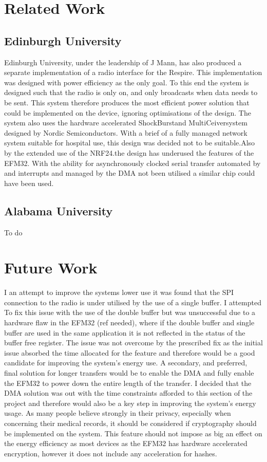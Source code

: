 \section{Related Work}

\subsection{Edinburgh University}
Edinburgh University, under the leadership of J Mann, has also produced a separate implementation
of a radio interface for the Respire. This implementation was designed with power efficiency as the
only goal. To this end the system is designed such that the radio is only on, and only broadcasts
when data needs to be sent. This system therefore produces the most efficient power solution that
could be implemented on the device, ignoring optimisations of the design. The system also uses the
hardware accelerated ShockBurst\textregistered and MultiCeiver\textregistered system designed by Nordic Semiconductors.
With a brief of a fully managed network system suitable for hospital use, this design was decided not
to be suitable.Also by the extended use of the NRF24.the design has underused the features of the
EFM32. With the ability for asynchronously clocked serial transfer automated by and interrupts and
managed by the DMA not been utilised a similar chip could have been used.

\subsection{Alabama University}
To do

\section{Future Work}
I an attempt to improve the systems lower use it was found that the SPI connection to the radio is
under utilised by the use of a single buffer. I attempted To fix this issue with the use of the double
buffer but was unsuccessful due to a hardware flaw in the EFM32 (ref needed), where if the double
buffer and single buffer are used in the same application it is not reflected in the status of the buffer
free register. The issue was not overcome by the prescribed fix as the initial issue absorbed the time
allocated for the feature and therefore would be a good candidate for improving the system’s
energy use. A secondary, and preferred, final solution for longer transfers would be to enable the
DMA and fully enable the EFM32 to power down the entire length of the transfer. I decided that the
DMA solution was out with the time constraints afforded to this section of the project and therefore
would also be a key step in improving the system’s energy usage.
As many people believe strongly in their privacy, especially when concerning their medical records, it
should be considered if cryptography should be implemented on the system. This feature should not
impose as big an effect on the energy efficiency as most devices as the EFM32 has hardware
accelerated encryption, however it does not include any acceleration for hashes.


